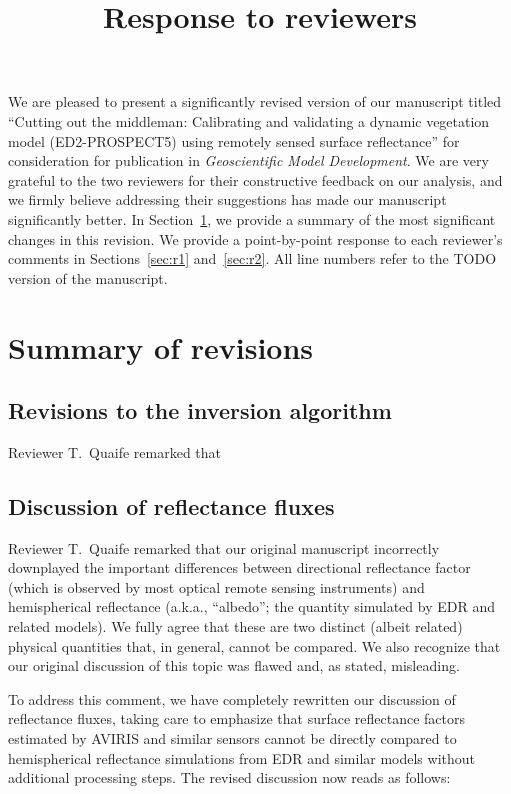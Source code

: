 \documentclass{article}
\title{Response to reviewers}
\author{}
\begin{document}
\maketitle

We are pleased to present a significantly revised version of our manuscript titled
``Cutting out the middleman: Calibrating and validating a dynamic vegetation model (ED2-PROSPECT5) using remotely sensed surface reflectance''
for consideration for publication in \emph{Geoscientific Model Development}.
We are very grateful to the two reviewers for their constructive feedback on our analysis, and we firmly believe addressing their suggestions has made our manuscript significantly better.
In Section~\ref{sec:summary}, we provide a summary of the most significant changes in this revision.
We provide a point-by-point response to each reviewer's comments in Sections~\ref{sec:r1} and~\ref{sec:r2}.
All line numbers refer to the TODO version of the manuscript.

\section{Summary of revisions}\label{sec:summary}

\subsection{Revisions to the inversion algorithm}\label{subsec:algorithm}

Reviewer T.\ Quaife remarked that

\subsection{Discussion of reflectance fluxes}\label{subsec:brdf}

Reviewer T.\ Quaife remarked that our original manuscript incorrectly downplayed the important differences between directional reflectance factor (which is observed by most optical remote sensing instruments) and hemispherical reflectance (a.k.a., ``albedo''; the quantity simulated by EDR and related models).
We fully agree that these are two distinct (albeit related) physical quantities that, in general, cannot be compared.
We also recognize that our original discussion of this topic was flawed and, as stated, misleading.

To address this comment, we have completely rewritten our discussion of reflectance fluxes, taking care to emphasize that surface reflectance factors estimated by AVIRIS and similar sensors cannot be directly compared to hemispherical reflectance simulations from EDR and similar models without additional processing steps. The revised discussion now reads as follows:
\end{document}
